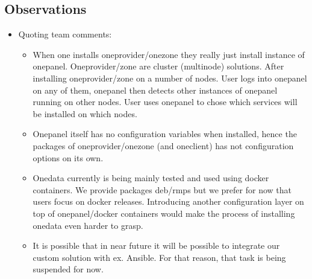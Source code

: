 \documentclass[a4wide,11pt]{article}
\begin{document}
\subsection{Observations}
\begin{itemize}
        \item Quoting team comments:\begin{itemize} \item When one installs oneprovider/onezone they really just install instance of onepanel. Oneprovider/zone are cluster (multinode) solutions. After installing oneprovider/zone on a number of nodes. User logs into onepanel on any of them, onepanel then detects other instances of onepanel running on other nodes. User uses onepanel to chose which services will be installed on which nodes. \item Onepanel itself has no configuration variables when installed, hence the packages of oneprovider/onezone (and oneclient) has not configuration options on its own. \item Onedata currently is being mainly tested and used using docker containers. We provide packages deb/rmps but we prefer for now that users focus on docker releases. Introducing another configuration layer on top of onepanel/docker containers would make the process of installing onedata even harder to grasp. \item It is possible that in near future it will be possible to integrate our custom solution with ex. Ansible. For that reason, that task is being suspended for now.\end{itemize}
    \end{itemize}


\newpage

\end{document}
